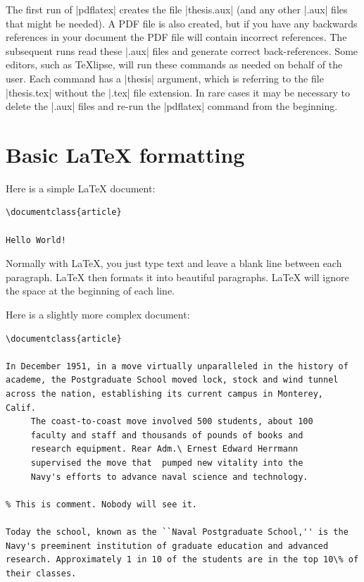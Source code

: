 The first run of |pdflatex| creates the file |thesis.aux| (and any other |.aux|
files that might be needed).  A PDF file is also created, but if you have any
backwards references in your document the PDF file will contain incorrect
references. The subsequent runs read these |.aux| files and generate correct
back-references. Some editors, such as {\TeX}lipse, will run these commands as
needed on behalf of the user.  Each command has a |thesis| argument, which is
referring to the file |thesis.tex| without the |.tex| file extension.  In rare
cases it may be necessary to delete the |.aux| files and re-run the |pdflatex|
command from the beginning.

\section{Basic \LaTeX{} formatting}
Here is a simple \LaTeX{} document:
\begin{Verbatim}
\documentclass{article}

Hello World!

\end{Verbatim}

Normally with \LaTeX{}, you just type text and leave a blank line between each
paragraph. \LaTeX{} then formats it into beautiful paragraphs. \LaTeX{} will
ignore the space at the beginning of each line.

Here is a slightly more complex document:

\begin{Verbatim}
\documentclass{article}

In December 1951, in a move virtually unparalleled in the history of
academe, the Postgraduate School moved lock, stock and wind tunnel
across the nation, establishing its current campus in Monterey,
Calif. 
     The coast-to-coast move involved 500 students, about 100
     faculty and staff and thousands of pounds of books and 
     research equipment. Rear Adm.\ Ernest Edward Herrmann 
     supervised the move that  pumped new vitality into the
     Navy's efforts to advance naval science and technology.

% This is comment. Nobody will see it.

Today the school, known as the ``Naval Postgraduate School,'' is the
Navy's preeminent institution of graduate education and advanced
research. Approximately 1 in 10 of the students are in the top 10\% of
their classes.

\end{Verbatim}

